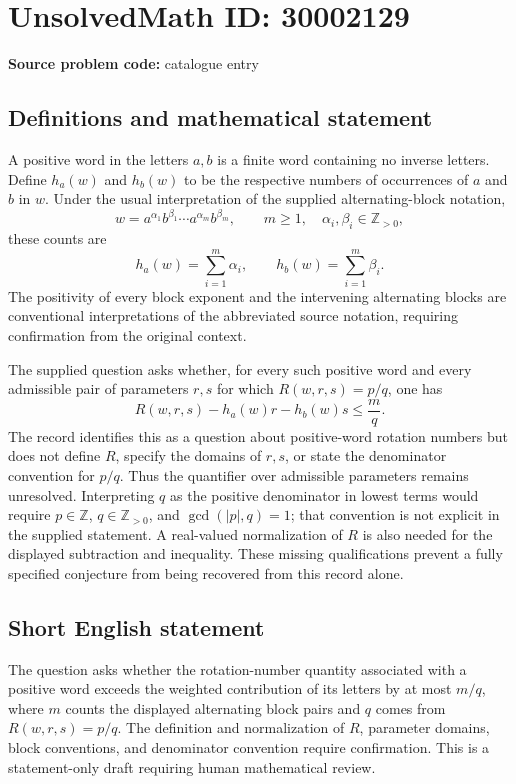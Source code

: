 \documentclass[11pt]{article}
\newcommand{\Z}{\mathbb{Z}}
\begin{document}
\section*{UnsolvedMath ID: 30002129}
\textbf{Source problem code:} catalogue entry
\subsection{Definitions and mathematical statement}
A positive word in the letters \(a,b\) is a finite word containing no inverse letters. Define \(h_a(w)\) and \(h_b(w)\) to be the respective numbers of occurrences of \(a\) and \(b\) in \(w\). Under the usual interpretation of the supplied alternating-block notation,
\[
w=a^{\alpha_1}b^{\beta_1}\cdots a^{\alpha_m}b^{\beta_m},\qquad m\geq 1,\quad \alpha_i,\beta_i\in\Z_{>0},
\]
these counts are
\[
h_a(w)=\sum_{i=1}^{m}\alpha_i,\qquad h_b(w)=\sum_{i=1}^{m}\beta_i.
\]
The positivity of every block exponent and the intervening alternating blocks are conventional interpretations of the abbreviated source notation, requiring confirmation from the original context.

The supplied question asks whether, for every such positive word and every admissible pair of parameters \(r,s\) for which \(R(w,r,s)=p/q\), one has
\[
R(w,r,s)-h_a(w)r-h_b(w)s\leq\frac{m}{q}.
\]
The record identifies this as a question about positive-word rotation numbers but does not define \(R\), specify the domains of \(r,s\), or state the denominator convention for \(p/q\). Thus the quantifier over admissible parameters remains unresolved. Interpreting \(q\) as the positive denominator in lowest terms would require \(p\in\Z\), \(q\in\Z_{>0}\), and \(\gcd(|p|,q)=1\); that convention is not explicit in the supplied statement. A real-valued normalization of \(R\) is also needed for the displayed subtraction and inequality. These missing qualifications prevent a fully specified conjecture from being recovered from this record alone.
\subsection{Short English statement}
The question asks whether the rotation-number quantity associated with a positive word exceeds the weighted contribution of its letters by at most \(m/q\), where \(m\) counts the displayed alternating block pairs and \(q\) comes from \(R(w,r,s)=p/q\). The definition and normalization of \(R\), parameter domains, block conventions, and denominator convention require confirmation. This is a statement-only draft requiring human mathematical review.
\end{document}
